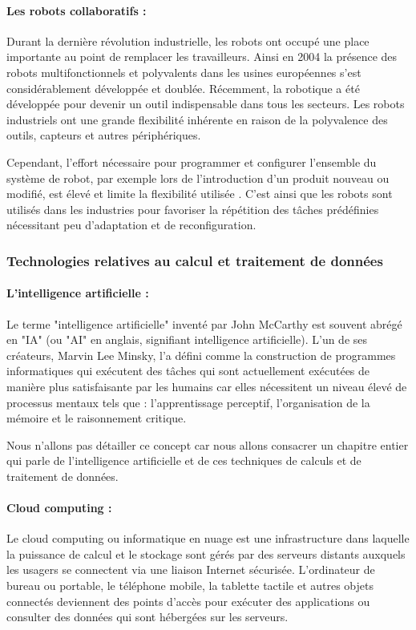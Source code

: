 \paragraph{Les robots collaboratifs :} Durant la dernière révolution industrielle, les robots ont occupé une place importante au point de remplacer les travailleurs. Ainsi en 2004 la présence des robots multifonctionnels et polyvalents dans les usines européennes s'est considérablement développée et doublée. Récemment, la robotique a été développée pour devenir un outil indispensable dans tous les secteurs. Les robots industriels ont une grande flexibilité inhérente en raison de la polyvalence des outils, capteurs et autres périphériques.

Cependant, l'effort nécessaire pour programmer et configurer l'ensemble du système de robot, par exemple lors de l'introduction d'un produit nouveau ou modifié, est élevé et limite la flexibilité utilisée \cite{michniewiczCyberphysicalRoboticsAutomated2014}. C'est ainsi que les robots sont utilisés dans les industries pour favoriser la répétition des tâches prédéfinies nécessitant peu d'adaptation et de reconfiguration.

\subsubsection{Technologies relatives au calcul et traitement de données}
\paragraph{L’intelligence artificielle :}
Le terme "intelligence artificielle" inventé par John McCarthy est souvent abrégé en "IA" (ou "AI" en anglais, signifiant intelligence artificielle). L'un de ses créateurs, Marvin Lee Minsky, l'a défini comme la construction de programmes informatiques qui exécutent des tâches qui sont actuellement exécutées de manière plus satisfaisante par les humains car elles nécessitent un niveau élevé de processus mentaux tels que : l'apprentissage perceptif, l'organisation de la mémoire et le raisonnement critique.

Nous n'allons pas détailler ce concept car nous allons consacrer un chapitre entier qui parle de l'intelligence artificielle et de ces techniques de calculs et de traitement de données.

\paragraph{Cloud computing :}
Le cloud computing ou informatique en nuage est une infrastructure dans laquelle la puissance de calcul et le stockage sont gérés par des serveurs distants auxquels les usagers se connectent via une liaison Internet sécurisée. L'ordinateur de bureau ou portable, le téléphone mobile, la tablette tactile et autres objets connectés deviennent des points d'accès pour exécuter des applications ou consulter des données qui sont hébergées sur les serveurs.

